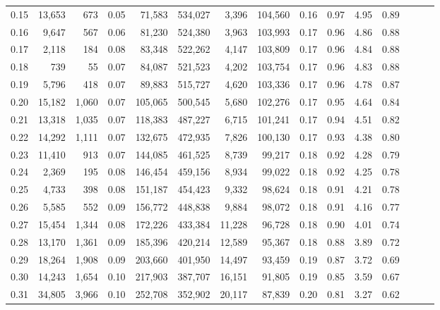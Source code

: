 \begin{tabular}{rrrrrrrrrrrrrrr}
0.15 &  13,653 &    673 &  0.05 &   71,583 &  534,027 &    3,396 &  104,560 &  0.16 &  0.97 &  4.95 &      0.89 \\
0.16 &   9,647 &    567 &  0.06 &   81,230 &  524,380 &    3,963 &  103,993 &  0.17 &  0.96 &  4.86 &      0.88 \\
0.17 &   2,118 &    184 &  0.08 &   83,348 &  522,262 &    4,147 &  103,809 &  0.17 &  0.96 &  4.84 &      0.88 \\
0.18 &     739 &     55 &  0.07 &   84,087 &  521,523 &    4,202 &  103,754 &  0.17 &  0.96 &  4.83 &      0.88 \\
0.19 &   5,796 &    418 &  0.07 &   89,883 &  515,727 &    4,620 &  103,336 &  0.17 &  0.96 &  4.78 &      0.87 \\
0.20 &  15,182 &  1,060 &  0.07 &  105,065 &  500,545 &    5,680 &  102,276 &  0.17 &  0.95 &  4.64 &      0.84 \\
0.21 &  13,318 &  1,035 &  0.07 &  118,383 &  487,227 &    6,715 &  101,241 &  0.17 &  0.94 &  4.51 &      0.82 \\
0.22 &  14,292 &  1,111 &  0.07 &  132,675 &  472,935 &    7,826 &  100,130 &  0.17 &  0.93 &  4.38 &      0.80 \\
0.23 &  11,410 &    913 &  0.07 &  144,085 &  461,525 &    8,739 &   99,217 &  0.18 &  0.92 &  4.28 &      0.79 \\
0.24 &   2,369 &    195 &  0.08 &  146,454 &  459,156 &    8,934 &   99,022 &  0.18 &  0.92 &  4.25 &      0.78 \\
0.25 &   4,733 &    398 &  0.08 &  151,187 &  454,423 &    9,332 &   98,624 &  0.18 &  0.91 &  4.21 &      0.78 \\
0.26 &   5,585 &    552 &  0.09 &  156,772 &  448,838 &    9,884 &   98,072 &  0.18 &  0.91 &  4.16 &      0.77 \\
0.27 &  15,454 &  1,344 &  0.08 &  172,226 &  433,384 &   11,228 &   96,728 &  0.18 &  0.90 &  4.01 &      0.74 \\
0.28 &  13,170 &  1,361 &  0.09 &  185,396 &  420,214 &   12,589 &   95,367 &  0.18 &  0.88 &  3.89 &      0.72 \\
0.29 &  18,264 &  1,908 &  0.09 &  203,660 &  401,950 &   14,497 &   93,459 &  0.19 &  0.87 &  3.72 &      0.69 \\
0.30 &  14,243 &  1,654 &  0.10 &  217,903 &  387,707 &   16,151 &   91,805 &  0.19 &  0.85 &  3.59 &      0.67 \\
0.31 &  34,805 &  3,966 &  0.10 &  252,708 &  352,902 &   20,117 &   87,839 &  0.20 &  0.81 &  3.27 &      0.62 \\

\end{tabular}
